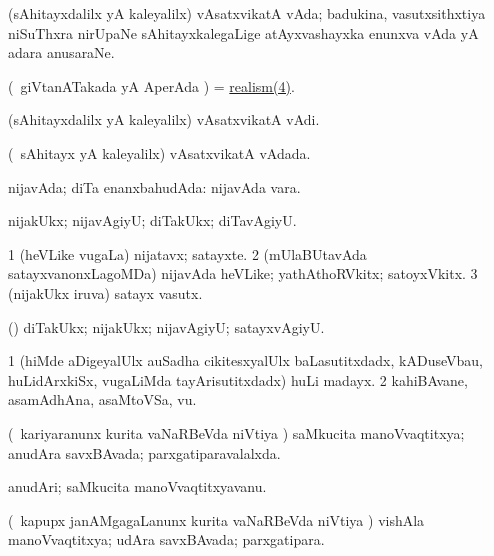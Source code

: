 \bentry
{} 
\gl{\nA}
\expl{}
\bmng
 (sAhitayxdalilx yA kaleyalilx) vAsatxvikatA vAda; badukina, vasutxsithxtiya niSuThxra nirUpaNe sAhitayxkalegaLige atAyxvashayxka enunxva vAda yA adara anusaraNe. 
\emng
\eentry

\bentry
{} 
\gl{\nA}
\bmng
 (\kanmu\ giVtanATakada yA AperAda \vi) = \hyperref{kandict_r.pdf}{R}{realism(4)}{realism(4)}. 
\emng
\eentry

\bentry
{} 
\gl{\nA}
\expl{}
\bmng
 (sAhitayxdalilx yA kaleyalilx) vAsatxvikatA vAdi. 
\emng
\eentry

\bentry
{} 
\gl{\gu}
\expl{}
\bmng
 (\sA\ sAhitayx yA kaleyalilx) vAsatxvikatA vAdada. 
\emng
\eentry

\bentry
{} 
\gl{\gu}
\expl{}
\bmng
 nijavAda; diTa enanxbahudAda:  nijavAda vara. 
\emng
\eentry

\bentry
{} 
\gl{\kirxvi}
\expl{}
\bmng
 nijakUkx; nijavAgiyU; diTakUkx; diTavAgiyU. 
\emng
\eentry

\bentry
{} 
\gl{\nA}
\bmng
\bnum
\num{1} (heVLike \mo vugaLa) nijatavx; satayxte. 
\num{2} (mUlaBUtavAda satayxvanonxLagoMDa) nijavAda heVLike; yathAthoRVkitx; satoyxVkitx. 
\num{3} (nijakUkx iruva) satayx vasutx. 
\enum
\emng

\noindent 
\gl{\pagu}
\expl{}
\bmng
{} (\pArxparx) diTakUkx; nijakUkx; nijavAgiyU; satayxvAgiyU. 
\emng
\eentry

\bentry
{} 
\gl{\nA}
\expl{}
\bmng
\bnum
\num{1} (hiMde aDigeyalUlx auSadha cikitesxyalUlx baLasutitxdadx, kADuseVbau, huLidArxkiSx, \mo vugaLiMda tayArisutitxdadx) huLi madayx. 
\num{2} kahiBAvane, asamAdhAna, asaMtoVSa, \mo vu. 
\enum
\emng
\eentry

\bentry 
{} 
\gl{\gu}
\expl{\SAfr\ }
\bmng
(\kanmu\ kariyaranunx kurita vaNaRBeVda niVtiya \vi) saMkucita manoVvaqtitxya; anudAra savxBAvada; parxgatiparavalalxda. 
\emng
\eentry

\bentry 
{} 
\gl{\nA}
\expl{\SAfr}
\bmng
anudAri; saMkucita manoVvaqtitxyavanu. 
\emng
\eentry

\bentry
{} 
\gl{\gu}
\expl{\SAfr}
\bmng
(\kanmu\ kapupx janAMgagaLanunx kurita vaNaRBeVda niVtiya \vi) vishAla manoVvaqtitxya; udAra savxBAvada; parxgatipara. 
\emng
\eentry

